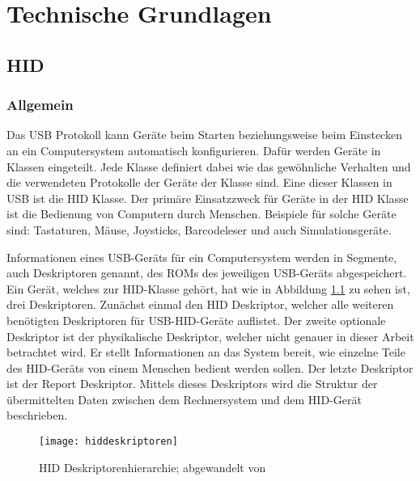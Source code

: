 
\chapter{Technische Grundlagen}

\section{\acf{HID}}

\subsection{Allgemein}
\label{section:bluetoothGenerall}
Das USB Protokoll kann Geräte beim Starten beziehungsweise beim Einstecken an ein Computersystem automatisch konfigurieren. Dafür werden Geräte in Klassen eingeteilt. Jede Klasse definiert dabei wie das gewöhnliche Verhalten und die verwendeten Protokolle der Geräte der Klasse sind. Eine dieser Klassen in USB ist die \ac{HID} Klasse. Der primäre Einsatzzweck für Geräte in der \acs{HID} Klasse ist die Bedienung von Computern durch Menschen. Beispiele für solche Geräte sind: Tastaturen, Mäuse, Joysticks, Barcodeleser und auch Simulationsgeräte. \cite[S.~1f.]{usbHIDS}

Informationen eines USB-Geräts für ein Computersystem werden in Segmente, auch Deskriptoren genannt, des ROMs des jeweiligen USB-Geräts abgespeichert. Ein Gerät, welches zur \acs{HID}-Klasse gehört, hat wie in Abbildung \ref{fig:hiddeskriptoren} zu sehen ist, drei Deskriptoren. Zunächst einmal den \acs{HID} Deskriptor, welcher alle weiteren benötigten Deskriptoren für USB-\acs{HID}-Geräte auflistet. Der zweite optionale Deskriptor ist der physikalische Deskriptor, welcher nicht genauer in dieser Arbeit betrachtet wird. Er stellt Informationen an das System bereit, wie einzelne Teile des \acs{HID}-Geräts von einem Menschen bedient werden sollen. Der letzte Deskriptor ist der Report Deskriptor. Mittels dieses Deskriptors wird die Struktur der übermittelten Daten zwischen dem Rechnersystem und dem \acs{HID}-Gerät beschrieben. \cite[S.~4f.]{usbHIDS}

\begin{figure}[H]
    \centering
    \texttt{[image: hiddeskriptoren]}
    \caption{\acs{HID} Deskriptorenhierarchie; abgewandelt von \cite[S.~4]{usbHIDS}}
    \label{fig:hiddeskriptoren}
\end{figure}

